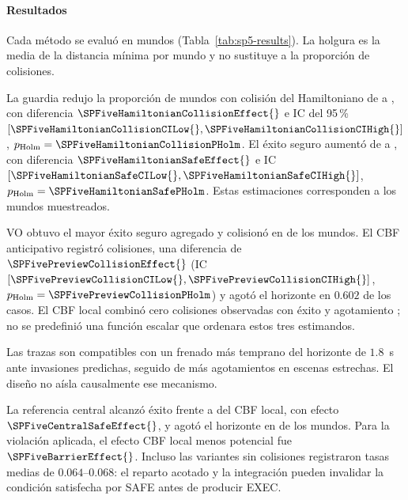 \paragraph{Resultados}

Cada método se evaluó en \SPFiveRunsPerMethod{} mundos (Tabla~\ref{tab:sp5-results}). La holgura es la media de la distancia mínima por mundo y no sustituye a la proporción de colisiones.

\begin{table}[!htbp]
  \centering
  \caption{Resultados agregados de E5-C. Proporciones sobre 108 mundos pareados por método.}
  \label{tab:sp5-results}
  \scriptsize
  \resizebox{\textwidth}{!}{}
  \viuownsource
\end{table}

La guardia redujo la proporción de mundos con colisión del Hamiltoniano de \SPFiveHamiltonianRawCollision{} a \SPFiveHamiltonianCBFCollision{}, con diferencia \(\SPFiveHamiltonianCollisionEffect{}\) e IC del 95\,\% \([\SPFiveHamiltonianCollisionCILow{},\SPFiveHamiltonianCollisionCIHigh{}]\), \(p_{\mathrm{Holm}}=\SPFiveHamiltonianCollisionPHolm\). El éxito seguro aumentó de \SPFiveHamiltonianRawSafe{} a \SPFiveHamiltonianCBFSafe{}, con diferencia \(\SPFiveHamiltonianSafeEffect{}\) e IC \([\SPFiveHamiltonianSafeCILow{},\SPFiveHamiltonianSafeCIHigh{}]\), \(p_{\mathrm{Holm}}=\SPFiveHamiltonianSafePHolm\). Estas estimaciones corresponden a los mundos muestreados.

VO obtuvo el mayor éxito seguro agregado y colisionó en \SPFiveVOCollision{} de los mundos. El CBF anticipativo registró \SPFivePreviewCollision{} colisiones, una diferencia de \(\SPFivePreviewCollisionEffect{}\) (IC \([\SPFivePreviewCollisionCILow{},\SPFivePreviewCollisionCIHigh{}]\), \(p_{\mathrm{Holm}}=\SPFivePreviewCollisionPHolm\)) y agotó el horizonte en \(0.602\) de los casos. El CBF local combinó cero colisiones observadas con éxito \SPFiveLocalCBFSafe{} y agotamiento \SPFiveLocalCBFTimeout{}; no se predefinió una función escalar que ordenara estos tres estimandos.

Las trazas son compatibles con un frenado más temprano del horizonte de $1.8$~s ante invasiones predichas, seguido de más agotamientos en escenas estrechas. El diseño no aísla causalmente ese mecanismo.

La referencia central alcanzó éxito \SPFiveCentralSafe{} frente a \SPFiveLocalCBFSafe{} del CBF local, con efecto \(\SPFiveCentralSafeEffect{}\), y agotó el horizonte en \SPFiveCentralTimeout{} de los mundos. Para la violación aplicada, el efecto CBF local menos potencial fue \(\SPFiveBarrierEffect{}\). Incluso las variantes sin colisiones registraron tasas medias de \(0.064\)--\(0.068\): el reparto acotado y la integración pueden invalidar la condición satisfecha por SAFE antes de producir EXEC.

